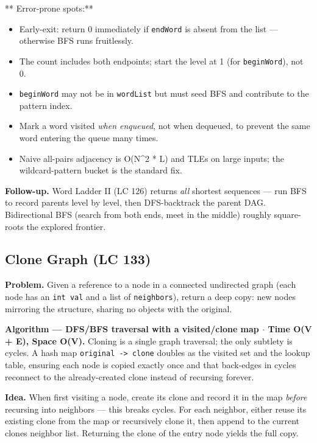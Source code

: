 \documentclass[11pt]{article}
\providecommand{\tightlist}{\setlength{\itemsep}{1pt}\setlength{\parskip}{0pt}}
\begin{document}
** Error-prone spots:**

\begin{itemize}
\tightlist
\item
  Early-exit: return 0 immediately if \texttt{endWord} is absent from the list --- otherwise BFS runs fruitlessly.
\item
  The count includes both endpoints; start the level at 1 (for \texttt{beginWord}), not 0.
\item
  \texttt{beginWord} may not be in \texttt{wordList} but must seed BFS and contribute to the pattern index.
\item
  Mark a word visited \emph{when enqueued}, not when dequeued, to prevent the same word entering the queue many times.
\item
  Naive all-pairs adjacency is O(N\^{}2 * L) and TLEs on large inputs; the wildcard-pattern bucket is the standard fix.
\end{itemize}

\textbf{Follow-up.} Word Ladder II (LC 126) returns \emph{all} shortest sequences --- run BFS to record parents level by level, then DFS-backtrack the parent DAG. Bidirectional BFS (search from both ends, meet in the middle) roughly square-roots the explored frontier.

\subsection{Clone Graph (LC 133)}\label{clone-graph-lc-133}

\textbf{Problem.} Given a reference to a node in a connected undirected graph (each node has an \texttt{int\ val} and a list of \texttt{neighbors}), return a deep copy: new nodes mirroring the structure, sharing no objects with the original.

\textbf{Algorithm --- DFS/BFS traversal with a visited/clone map \(\cdot\) Time O(V + E), Space O(V).} Cloning is a single graph traversal; the only subtlety is cycles. A hash map \texttt{original\ -\textgreater{}\ clone} doubles as the visited set and the lookup table, ensuring each node is copied exactly once and that back-edges in cycles reconnect to the already-created clone instead of recursing forever.

\textbf{Idea.} When first visiting a node, create its clone and record it in the map \emph{before} recursing into neighbors --- this breaks cycles. For each neighbor, either reuse its existing clone from the map or recursively clone it, then append to the current clone\textquotesingle s neighbor list. Returning the clone of the entry node yields the full copy.
\end{document}
